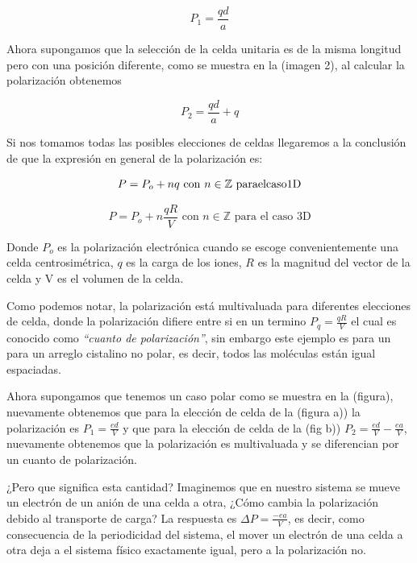 \begin{equation}
    P_1 = \frac{qd}{a}
\end{equation}

Ahora supongamos que la selección de la celda unitaria es de la misma longitud pero con una posición diferente, como se muestra en la (imagen 2), al calcular la polarización obtenemos 

\begin{equation}
    P_2 = \frac{qd}{a} + q
\end{equation}

Si nos tomamos todas las posibles elecciones de celdas llegaremos a la conclusión de que la expresión en general de la polarización es:

\begin{equation}
    P = P_o + nq\,\,  {\rm con} \,\,n \in \mathbb{Z}\,\, {\rm para el caso 1D} 
\end{equation}

\begin{equation}
    P = P_o + n\frac{qR}{V}\,\,  \text{con} \,\,n \in \mathbb{Z}\,\, \text{para el caso 3D}
\end{equation}

Donde $P_o$ es la polarización electrónica cuando se escoge convenientemente una celda centrosimétrica, $q$ es la carga de los iones, $R$ es la magnitud del vector de la celda y V es el volumen de la celda.

Como podemos notar, la polarización está multivaluada para diferentes elecciones de celda, donde la polarización difiere entre si en un termino $P_q = \frac{qR}{V}$ el cual es conocido como \textit{``cuanto de polarización''}, sin embargo este ejemplo es para un para un arreglo cistalino no polar, es decir, todos las moléculas están igual espaciadas. 

Ahora supongamos que tenemos un caso polar como se muestra en la (figura), nuevamente obtenemos que para la elección de celda de la (figura a)) la polarización es $P_1 = \frac{ed}{V}$ y que para la elección de celda de la (fig b)) $P_2 = \frac{ed}{V} - \frac{ea}{V}$, nuevamente obtenemos que la polarización es multivaluada y se diferencian por un cuanto de polarización.

¿Pero que significa esta cantidad? Imaginemos que en nuestro sistema se mueve un electrón de un anión de una celda a otra, ¿Cómo cambia la polarización debido al transporte de carga? La respuesta es $\Delta P = \frac{-ea}{V}$, es decir, como consecuencia de la periodicidad del sistema, el mover un electrón de una celda a otra deja a el sistema físico exactamente igual, pero a la polarización no.

